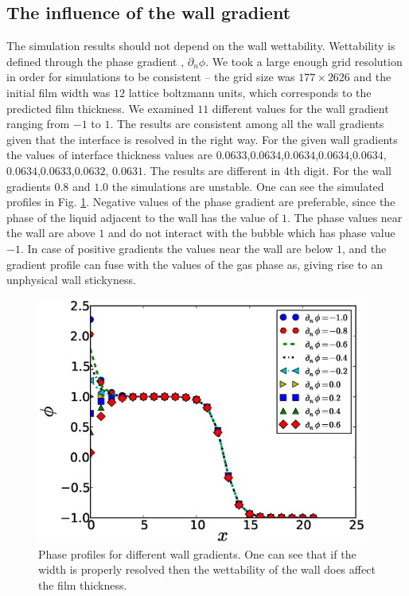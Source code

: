 \documentclass{article}
\begin{document}
\begin{table}


\end{table}


\subsection{The influence of the wall gradient}
The simulation results should not depend on the wall wettability. Wettability is defined
through the phase gradient \cite{pooley-contact}, $\partial_n \phi$.  We took a large
enough grid resolution in order for simulations to be consistent -- the grid size was
$177 \times 2626$ and the initial film width was
$12$ lattice boltzmann units, which corresponds to the predicted film thickness.
We examined $11$ different values for the wall
gradient ranging from $-1$ to $1$. The results are consistent among all the
wall gradients given that the interface is resolved in the right way. For the
given wall gradients the values of interface thickness values are
$0.0633$,$0.0634$,$0.0634$,$0.0634$,$0.0634$,$0.0634$,$0.0633$,$0.0632$,
$0.0631$. The results are different in 4th digit. For the wall gradients $0.8$
and $1.0$ the
simulations are unstable. One can see the simulated profiles in Fig.
\ref{fig:gradients:profiles}. Negative values of the phase gradient are
preferable, since the phase of the liquid adjacent to the wall has the value of $1$.
The phase values near the wall are above $1$ and do not interact
with the bubble which has phase value $-1$.  In case of positive
gradients the values near the wall are below $1$, and the gradient profile can
fuse with the values of the gas phase as, giving rise to an unphysical wall stickyness.
\begin{figure}
\includegraphics[width=0.97\textwidth]{Figures/Wall/phase_grad_profiles.eps}
\caption{Phase profiles for different wall gradients. One can see that if the width
is properly resolved then the wettability of the wall does affect the film thickness.
\label{fig:gradients:profiles}
}
\end{figure}
\end{document}

